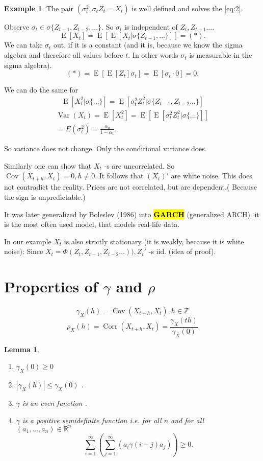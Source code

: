 \documentclass[12pt,a4paper, notitlepage]{book}
\newcommand{\hlc}[2][yellow]{ {\sethlcolor{#1} \hl{#2}} }
\newcommand{\hlcr}[1]{\hlc[lightred]{#1}}
\theoremstyle{definition} %
\newtheorem{example}{Example}[chapter]
\theoremstyle{plain} %
\newtheorem{lemma}{Lemma}[chapter]
\newcommand{\R}{\mathbb R}
\newcommand{\Z}{\mathbb Z}
\DeclareMathOperator{\Var}{Var}
\DeclareMathOperator{\Cov}{Cov}
\DeclareMathOperator{\E}{E}
\DeclareMathOperator{\Corr}{Corr}
\newcommand{\New}[1]{ {\bf \hlcr{#1} } }
\begin{document}
\begin{example}
The pair $(\sigma_t^2, \sigma_t Z_t = X_t)$ is well defined and solves the  
\ref{eq:2}.

Observe $\sigma_t \in \sigma\{ Z_{t-1},Z_{t-2}, \dots\}$. So $\sigma_t$ is independent of $Z_t, Z_{t+1} \dots$.
\[ \E[X_t] = \E\left[ \E\left[ X_t | \sigma\{ Z_{t-1}, \dots\} \right] \right]  = (*). \]
 We can take $\sigma_t$ out, if it is a constant (and it is, because we know
 the sigma algebra and therefore all values before $t$. In other words $\sigma_t$ is measurable in the sigma algebra). 
\[ (*) = \E \left[ \E \left[ Z_t \right] \sigma_t  \right] = \E \left[ \sigma_t \cdot 0 \right] = 0 . \]

We can do the same for 
\begin{align*} \E\left[ X_t^2 | \sigma\{\dots\} \right]  =  \E \left[  \sigma_t^2 Z_t ^2 | \sigma \{ Z_{t-1}, Z_{t-2} \ldots \} \right] \end{align*}
\begin{align*} \Var(X_t) = \E[X_t^2] = \E[\E[ \sigma_t^2 Z_t^2 | \sigma\{\dots\} ] ] \\
 = E(\sigma_t^2) = \frac{\alpha_0}{1 - \alpha_1}. \end{align*}

So variance does not change. Only the conditional variance does.

Similarly one can show that $X_t$ -s are uncorrelated. So $ \Cov(X_{t+ h}, X_t) = 0, h \neq 0$. It follows that $(X_t)'$ are white noise. This does not contradict the reality. Prices are not correlated, but are dependent.( Because the sign is unpredictable.)


It was later generalized by Boleslev (1986) into \New{GARCH} (generalized ARCH). it is the most often used model, that models real-life data.

In our example $X_t$ is also strictly stationary (it is weakly, because it is white noise):
Since $X_t = \Phi(Z_t, Z_{t-1}, Z_{t-2}  \dots) ) ,  Z_t ' $ -s iid. (idea of proof). 
\end{example}

\section{Properties of $\gamma$ and $\rho$}

\[\gamma_X(h) = \Cov(X_{t+h}, X_t), h \in \Z \]
\[ \rho_X(h) = \Corr(X_{t+h},X_t) = \frac{ \gamma_X(th) }{ \gamma_X(0) } \]

\begin{lemma}
\begin{enumerate}

\item $\gamma_X(0) \geq 0$
\item $|\gamma_X(h)| \leq \gamma_X(0)$ .
\item $\gamma$ is an even function .
\item $\gamma$ is a positive semidefinite function i.e. for all $n$ and for all $(a_1, \dots, a_n) \in \R^n$ 
\[ \sum_{i=1}^\infty \left( \sum_{j=1 }^\infty \left( a_i \gamma(i -j) a_j \right) \right) \geq 0 . \]
\end{enumerate}
\end{lemma}
\end{document}

